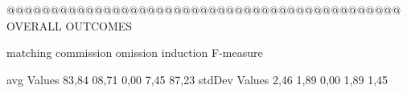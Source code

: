  @@@@@@@@@@@@@@@@@@@@@@@@@@@@@@@@@@@@@@@@@@@@@ OVERALL OUTCOMES

                matching commission   omission  induction  F-measure
      
avg Values      83,84      08,71       0,00      7,45    87,23      
stdDev Values    2,46       1,89       0,00       1,89    1,45       
